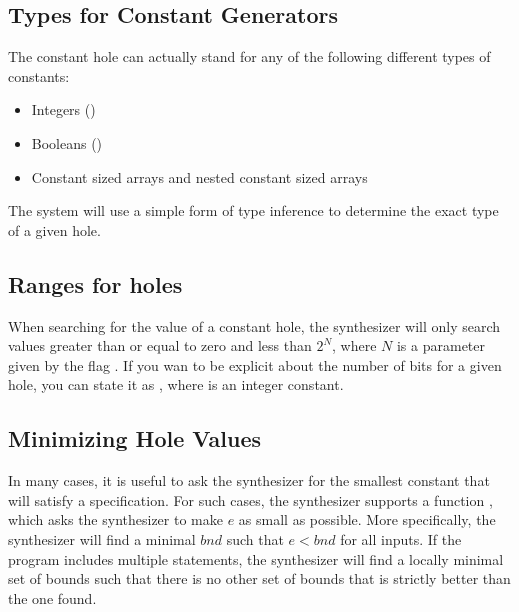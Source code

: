 \subsection{Types for Constant Generators}
The constant hole  can actually stand for any of the following different types of constants: 
\begin{itemize}
	\item Integers ()
	\item Booleans ()
	\item Constant sized arrays and nested constant sized arrays
\end{itemize}

The system will use a simple form of type inference to determine the exact type of a given hole.

\subsection{Ranges for holes}
When searching for the value of a constant hole, the synthesizer will only search values greater than or equal to zero and less than $2^N$, where $N$ is a parameter given by the flag . If you wan to be explicit about the number of bits for a given hole, you can state it as , where  is an integer constant.



\subsection{Minimizing Hole Values}
In many cases, it is useful to ask the synthesizer for the smallest constant that will satisfy a specification. For such cases, the synthesizer supports a function , which asks the synthesizer to make $e$ as small as possible. More specifically, the synthesizer will find a minimal $bnd$ such that $e < bnd$ for all inputs. If the program includes multiple  statements, the synthesizer will find a locally minimal set of bounds such that there is no other set of bounds that is strictly better than the one found. 



